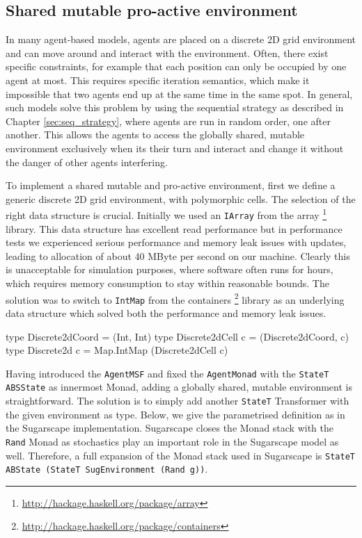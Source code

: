 \subsection{Shared mutable pro-active environment}
In many agent-based models, agents are placed on a discrete 2D grid environment and can move around and interact with the environment. Often, there exist specific constraints, for example that each position can only be occupied by one agent at most. This requires specific iteration semantics, which make it impossible that two agents end up at the same time in the same spot. In general, such models solve this problem by using the sequential strategy as described in Chapter \ref{sec:seq_strategy}, where agents are run in random order, one after another. This allows the agents to access the globally shared, mutable environment exclusively when its their turn and interact and change it without the danger of other agents interfering.

To implement a shared mutable and pro-active environment, first we define a generic discrete 2D grid environment, with polymorphic cells. The selection of the right data structure is crucial. Initially we used an \texttt{IArray} from the array \footnote{\url{http://hackage.haskell.org/package/array}} library. This data structure has excellent read performance but in performance tests we experienced serious performance and memory leak issues with updates, leading to allocation of about 40 MByte per second on our machine. Clearly this is unacceptable for simulation purposes, where software often runs for hours, which requires memory consumption to stay within reasonable bounds. The solution was to switch to \texttt{IntMap} from the containers \footnote{\url{http://hackage.haskell.org/package/containers}} library as an underlying data structure which solved both the performance and memory leak issues.

\begin{HaskellCode}
type Discrete2dCoord  = (Int, Int)
type Discrete2dCell c = (Discrete2dCoord, c)
type Discrete2d c     = Map.IntMap (Discrete2dCell c)
\end{HaskellCode}

Having introduced the \texttt{AgentMSF} and fixed the \texttt{AgentMonad} with the \texttt{StateT ABSState} as innermost Monad, adding a globally shared, mutable environment is straightforward. The solution is to simply add another \texttt{StateT} Transformer with the given environment as type. Below, we give the parametrised definition as in the Sugarscape implementation. Sugarscape closes the Monad stack with the \texttt{Rand} Monad as stochastics play an important role in the Sugarscape model as well. Therefore, a full expansion of the Monad stack used in Sugarscape is \texttt{StateT ABState (StateT SugEnvironment (Rand g))}.

